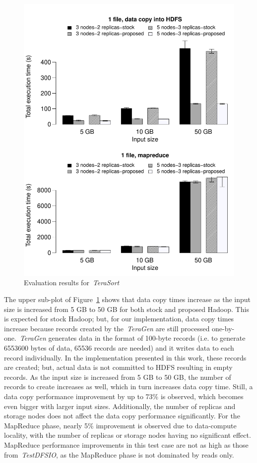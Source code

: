 \begin{figure}[!htbp]
\centering
\includegraphics[width=\columnwidth, keepaspectratio]{result4.pdf}
\caption{Evaluation results for~\textit{TeraSort}}
\label{terasortres}
\end{figure}

The upper sub-plot of Figure~\ref{terasortres} shows that data copy times increase as the input
size is increased from 5 GB to 50 GB for both stock and proposed Hadoop. This is expected for stock
Hadoop; but, for our implementation, data copy times increase because records created by
the~\textit{TeraGen} are still processed one-by-one.~\textit{TeraGen} generates data in the format
of 100-byte records (i.e. to generate 6553600 bytes of data, 65536 records are needed) and it writes
data to each record individually. In the implementation presented in this work, these records
are created; but, actual data is not committed to HDFS resulting in empty records. As the input
size is increased from 5 GB to 50 GB, the number of records to create increases as well, which
in turn increases data copy time. Still, a data copy performance improvement by up to 73\% is
observed, which becomes even bigger with larger input sizes. Additionally, the number of replicas
and storage nodes does not affect the data copy performance significantly. For the MapReduce phase,
nearly 5\% improvement is observed due to data-compute locality, with the number of replicas or
storage nodes having no significant effect. MapReduce performance improvements in this
test case are not as high as those from~\textit{TestDFSIO}, as the MapReduce phase is not dominated by reads
only.
